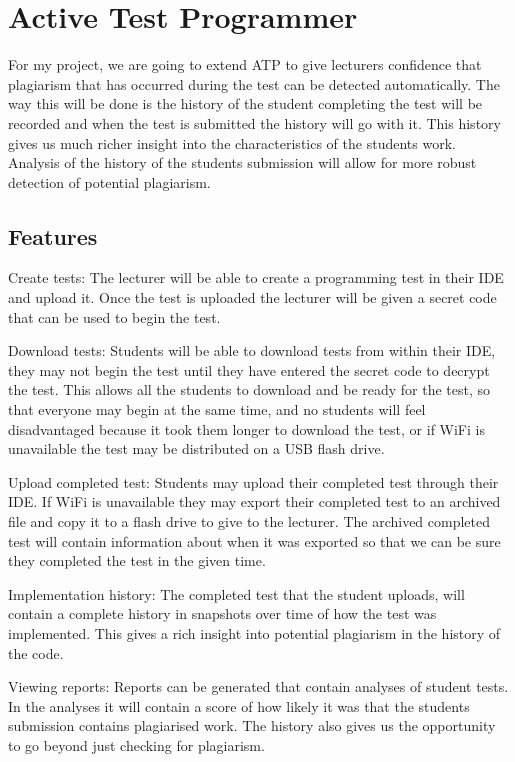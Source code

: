 \documentclass[twocolumn]{article}
\begin{document}
\section{Active Test Programmer}
For my project, we are going to extend ATP to give lecturers confidence that
plagiarism that has occurred during the test can be detected automatically. The
way this will be done is the history of the student completing the test will be
recorded and when the test is submitted the history will go with it. This
history gives us much richer insight into the characteristics of the students
work. Analysis of the history of the students submission will allow for more
robust detection of potential plagiarism.

\subsection{Features} \label{sec:Features}
Create tests: The lecturer will be able to create a programming test in their
IDE and upload it. Once the test is uploaded the lecturer will be given a secret
code that can be used to begin the test.

Download tests: Students will be able to download tests from within their IDE,
they may not begin the test until they have entered the secret code to decrypt
the test. This allows all the students to download and be ready for the test, so
that everyone may begin at the same time, and no students will feel
disadvantaged because it took them longer to download the test, or if WiFi is
unavailable the test may be distributed on a USB flash drive.

Upload completed test: Students may upload their completed test through their
IDE. If WiFi is unavailable they may export their completed test to an archived
file and copy it to a flash drive to give to the lecturer. The archived
completed test will contain information about when it was exported so that we
can be sure they completed the test in the given time.

Implementation history: The completed test that the student uploads, will
contain a complete history in snapshots over time of how the test was
implemented. This gives a rich insight into potential plagiarism in the history
of the code.

Viewing reports: Reports can be generated that contain analyses of student
tests. In the analyses it will contain a score of how likely it was that the
students submission contains plagiarised work. The history also gives us the
opportunity to go beyond just checking for plagiarism.
\end{document}
